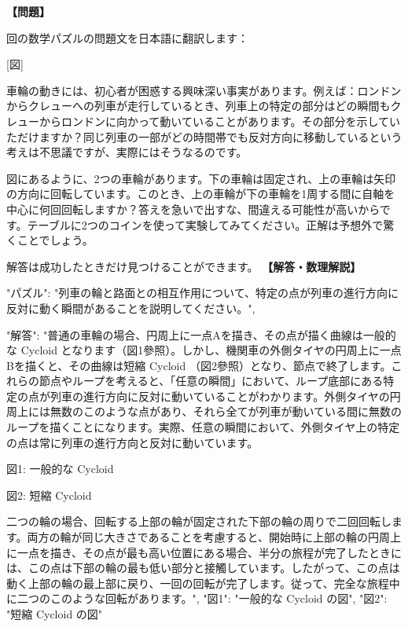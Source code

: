 \documentclass[10pt,a4paper,oneside,openany]{ltjsbook}
\begin{document}
\begin{tcolorbox}[colback=softblue,colframe=primaryblue,title=\textbf{第 203 問：CONCERNING WHEELS.},arc=2mm,boxrule=1pt,breakable]
\textbf{【問題】}\par\vspace{0.3em}
回の数学パズルの問題文を日本語に翻訳します：

[図]

車輪の動きには、初心者が困惑する興味深い事実があります。例えば：ロンドンからクレューへの列車が走行しているとき、列車上の特定の部分はどの瞬間もクレューからロンドンに向かって動いていることがあります。その部分を示していただけますか？同じ列車の一部がどの時間帯でも反対方向に移動しているという考えは不思議ですが、実際にはそうなるのです。

図にあるように、2つの車輪があります。下の車輪は固定され、上の車輪は矢印の方向に回転しています。このとき、上の車輪が下の車輪を1周する間に自軸を中心に何回回転しますか？答えを急いで出すな、間違える可能性が高いからです。テーブルに2つのコインを使って実験してみてください。正解は予想外で驚くことでしょう。

解答は成功したときだけ見つけることができます。
\tcblower
\textbf{【解答・数理解説】}\par\vspace{0.3em}
{
"パズル": "列車の輪と路面との相互作用について、特定の点が列車の進行方向に反対に動く瞬間があることを説明してください。",

"解答": "普通の車輪の場合、円周上に一点Aを描き、その点が描く曲線は一般的な Cycloid となります（図1參照）。しかし、機関車の外側タイヤの円周上に一点Bを描くと、その曲線は短縮 Cycloid （図2參照）となり、節点で終了します。これらの節点やループを考えると、「任意の瞬間」において、ループ底部にある特定の点が列車の進行方向に反対に動いていることがわかります。外側タイヤの円周上には無数のこのような点があり、それら全てが列車が動いている間に無数のループを描くことになります。実際、任意の瞬間において、外側タイヤ上の特定の点は常に列車の進行方向と反対に動いています。

図1: 一般的な Cycloid

図2: 短縮 Cycloid

二つの輪の場合、回転する上部の輪が固定された下部の輪の周りで二回回転します。両方の輪が同じ大きさであることを考慮すると、開始時に上部の輪の円周上に一点を描き、その点が最も高い位置にある場合、半分の旅程が完了したときには、この点は下部の輪の最も低い部分と接觸しています。したがって、この点は動く上部の輪の最上部に戻り、一回の回転が完了します。従って、完全な旅程中に二つのこのような回転があります。",
"図1": "一般的な Cycloid の図",
"図2": "短縮 Cycloid の図"
}
\end{tcolorbox}
\end{document}
